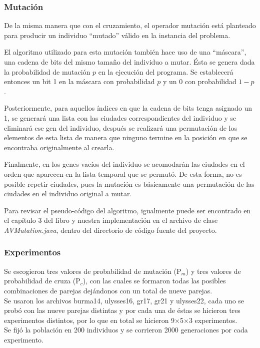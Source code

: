 \documentclass[12pt]{article}
\begin{document}
\subsubsection*{Mutación}
De la misma manera que con el cruzamiento, el operador mutación está planteado
para producir un individuo ``mutado'' válido en la instancia del problema.\par
El algoritmo utilizado para esta mutación también hace uso de una ``máscara'',
una cadena de bits del mismo tamaño del individuo a mutar. Ésta se genera dada
la probabilidad de mutación $p$ en la ejecución del programa. Se establecerá entonces
un bit 1 en la máscara con probabilidad $p$ y un 0 con probabilidad $1-p$.\par
Posteriormente, para aquellos índices en que la cadena de bits tenga asignado
un 1, se generará una lista con las ciudades correspondientes del individuo y
se eliminará ese gen del individuo, después
se realizará una permutación de los elementos de esta lista de manera que
ninguno termine en la posición en que se encontraba originalmente al crearla.\par
Finalmente, en los genes vacíos del individuo se acomodarán las ciudades en el
orden que aparecen en la lista temporal que se permutó. De esta forma, no es posible
repetir ciudades, pues la mutación es básicamente una permutación de las ciudades
en el individuo original a mutar.\par
Para revisar el pseudo-código del algoritmo, igualmente puede ser encontrado en
el capítulo 3 del libro y nuestra implementación en el archivo de clase
\textit{AVMutation.java}, dentro del directorio de código fuente del proyecto.

\subsubsection*{Experimentos}
Se escogieron tres valores de probabilidad de mutación (P$_m$) y tres valores de
probabilidad de cruza (P$_c$), con las cuales se formaron todas las posibles
combinaciones de parejas dejándonos con un total de nueve parejas. \\

\noindent Se usaron los archivos burma14, ulysses16, gr17, gr21 y ulysses22, cada uno se probó
con las nueve parejas distintas y por cada una de éstas se hicieron tres experimentos
distintos, por lo que en total se hicieron 9$\times$5$\times$3 experimentos. \\

\noindent Se fijó la población en 200 individuos y se corrieron 2000 generaciones por cada
experimento. \\
\end{document}
